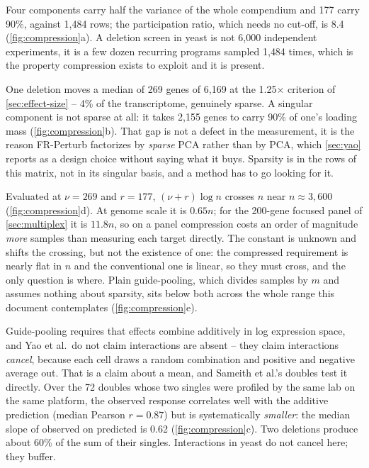  Four components carry half the variance
of the whole compendium and 177 carry 90\%, against 1{,}484 rows; the
participation ratio, which needs no cut-off, is 8.4
(\cref{fig:compression}a). A deletion screen in yeast is not 6{,}000 independent
experiments, it is a few dozen recurring programs sampled 1{,}484 times, which is
the property compression exists to exploit and it is present.

 One
deletion moves a median of 269 genes of 6{,}169 at the 1.25$\times$ criterion of
\cref{sec:effect-size} -- 4\% of the transcriptome, genuinely sparse. A singular
component is not sparse at all: it takes 2{,}155 genes to carry 90\% of one's
loading mass (\cref{fig:compression}b). That gap is not a defect in the
measurement, it is the reason FR-Perturb factorizes by \emph{sparse} PCA rather
than by PCA, which \cref{sec:yao} reports as a design choice without saying what
it buys. Sparsity is in the rows of this matrix, not in its singular basis, and a
method has to go looking for it.

Evaluated at $\nu=269$ and $r=177$, $(\nu+r)\log n$ crosses $n$ near
$n\approx3{,}600$ (\cref{fig:compression}d). At genome scale it is $0.65n$; for
the 200-gene focused panel of \cref{sec:multiplex} it is $11.8n$, so on a panel
compression costs an order of magnitude \emph{more} samples than measuring each
target directly. The constant is unknown and shifts the crossing, but not the
existence of one: the compressed requirement is nearly flat in $n$ and the
conventional one is linear, so they must cross, and the only question is where.
Plain guide-pooling, which divides samples by $m$ and assumes nothing about
sparsity, sits below both across the whole range this document contemplates
(\cref{fig:compression}e).

Guide-pooling requires that effects combine additively in log expression space,
and Yao et al.\ do not claim interactions are absent -- they claim interactions
\emph{cancel}, because each cell draws a random combination and positive and
negative average out. That is a claim about a mean, and Sameith et al.'s doubles
test it directly. Over the 72 doubles whose two singles were profiled by the same
lab on the same platform, the observed response correlates well with the additive
prediction (median Pearson $r=0.87$) but is systematically \emph{smaller}: the
median slope of observed on predicted is 0.62 (\cref{fig:compression}c). Two
deletions produce about 60\% of the sum of their singles. Interactions in yeast
do not cancel here; they buffer.

